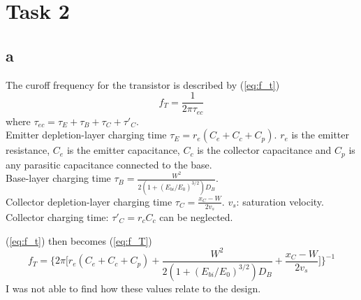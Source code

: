 \documentclass[12pt,a4paper]{article}
\begin{document}
\section{Task 2}
\subsection{a}
The curoff frequency for the transistor is described by (\ref{eq:f_t})
\begin{equation}
  \label{eq:f_t}
  f_T=\frac{1}{2\pi \tau_{ec}}
\end{equation}
where $\tau_{ec}=\tau_{E}+\tau_{B}+\tau_{C}+\tau'_{C}$.\\
Emitter depletion-layer charging time $\tau_{E}=r_e(C_e+C_c+C_p)$. $r_e$ is the emitter resistance, $C_e$ is the emitter capacitance, $C_c$ is the collector capacitance and $C_p$ is any parasitic capacitance connected to the base.\\
\noindent Base-layer charging time $\tau_{B}=\frac{W^2}{2(1+(E_{bi}/E_{0})^{3/2}) D_B}$.\\
\noindent Collector depletion-layer charging time $\tau_C=\frac{x_C-W}{2v_s}$. $v_s$: saturation velocity.\\
\noindent Collector charging time: $\tau'_C=r_{c}C_c$ can be neglected.

(\ref{eq:f_t}) then becomes (\ref{eq:f_T})
\begin{equation}
  \label{eq:f_T}
  f_T=\bigg\{2\pi\bigg[r_e(C_e+C_c+C_p)+\frac{W^2}{2(1+(E_{bi}/E_{0})^{3/2}) D_B}+\frac{x_C-W}{2v_s}\bigg]\bigg\}^{-1}
\end{equation}
I was not able to find how these values relate to the design.
\end{document}
